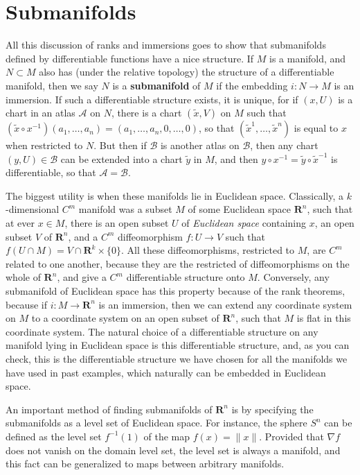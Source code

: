 \section{Submanifolds}

All this discussion of ranks and immersions goes to show that submanifolds defined by differentiable functions have a nice structure. If $M$ is a manifold, and $N \subset M$ also has (under the relative topology) the structure of a differentiable manifold, then we say $N$ is a {\bf submanifold} of $M$ if the embedding $i: N \to M$ is an immersion. If such a differentiable structure exists, it is unique, for if $(x,U)$ is a chart in an atlas $\mathcal{A}$ on $N$, there is a chart $(\tilde{x},V)$ on $M$ such that $(\tilde{x} \circ x^{-1})(a_1, \dots, a_n) = (a_1, \dots, a_n, 0, \dots, 0)$, so that $(\tilde{x}^1, \dots, \tilde{x}^n)$ is equal to $x$ when restricted to $N$. But then if $\mathcal{B}$ is another atlas on $\mathcal{B}$, then any chart $(y,U) \in \mathcal{B}$ can be extended into a chart $\tilde{y}$ in $M$, and then $y \circ x^{-1} = \tilde{y} \circ \tilde{x}^{-1}$ is differentiable, so that $\mathcal{A} = \mathcal{B}$.

\begin{example}
    The biggest utility is when these manifolds lie in Euclidean space. Classically, a $k$-dimensional $C^m$ manifold was a subset $M$ of some Euclidean space $\mathbf{R}^n$, such that at ever $x \in M$, there is an open subset $U$ of {\it Euclidean space} containing $x$, an open subset $V$ of $\mathbf{R}^n$, and a $C^m$ diffeomorphism $f: U \to V$ such that $f(U \cap M) = V \cap \mathbf{R}^k \times \{ 0 \}$. All these diffeomorphisms, restricted to $M$, are $C^m$ related to one another, because they are the restricted of diffeomorphisms on the whole of $\mathbf{R}^n$, and give a $C^m$ differentiable structure onto $M$. Conversely, any submanifold of Euclidean space has this property because of the rank theorems, because if $i: M \to \mathbf{R}^n$ is an immersion, then we can extend any coordinate system on $M$ to a coordinate system on an open subset of $\mathbf{R}^n$, such that $M$ is flat in this coordinate system. The natural choice of a differentiable structure on any manifold lying in Euclidean space is this differentiable structure, and, as you can check, this is the differentiable structure we have chosen for all the manifolds we have used in past examples, which naturally can be embedded in Euclidean space.
\end{example}

An important method of finding submanifolds of $\mathbf{R}^n$ is by specifying the submanifolds as a level set of Euclidean space. For instance, the sphere $S^n$ can be defined as the level set $f^{-1}(1)$ of the map $f(x) = \| x \|$. Provided that $\nabla f$ does not vanish on the domain level set, the level set is always a manifold, and this fact can be generalized to maps between arbitrary manifolds.

